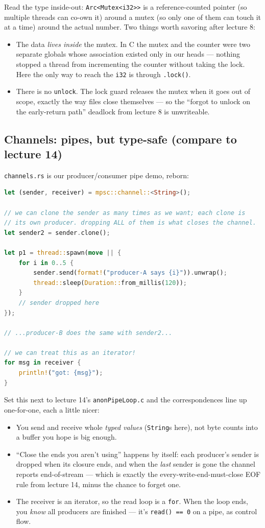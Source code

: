 \documentclass[11pt]{article}
\begin{document}
Read the type inside-out: \texttt{Arc<Mutex<i32>>} is a reference-counted
pointer (so multiple threads can co-own it) around a mutex (so only
one of them can touch it at a time) around the actual number. Two
things worth savoring after lecture 8:
\begin{itemize}
  \item The data \emph{lives inside} the mutex. In C the mutex and
    the counter were two separate globals whose association existed
    only in our heads --- nothing stopped a thread from incrementing
    the counter without taking the lock. Here the only way to reach
    the \texttt{i32} is through \texttt{.lock()}.
  \item There is no \texttt{unlock}. The lock guard releases the
    mutex when it goes out of scope, exactly the way files close
    themselves --- so the ``forgot to unlock on the early-return
    path'' deadlock from lecture 8 is unwriteable.
\end{itemize}

\subsection*{Channels: pipes, but type-safe (compare to lecture 14)}

\texttt{channels.rs} is our producer/consumer pipe demo, reborn:

\begin{lstlisting}[language=Rust]
let (sender, receiver) = mpsc::channel::<String>();

// we can clone the sender as many times as we want; each clone is
// its own producer. dropping ALL of them is what closes the channel.
let sender2 = sender.clone();

let p1 = thread::spawn(move || {
    for i in 0..5 {
        sender.send(format!("producer-A says {i}")).unwrap();
        thread::sleep(Duration::from_millis(120));
    }
    // sender dropped here
});

// ...producer-B does the same with sender2...

// we can treat this as an iterator!
for msg in receiver {
    println!("got: {msg}");
}
\end{lstlisting}

Set this next to lecture 14's \texttt{anonPipeLoop.c} and the
correspondences line up one-for-one, each a little nicer:
\begin{itemize}
  \item You send and receive whole \emph{typed values}
    (\texttt{String}s here), not byte counts into a buffer you hope
    is big enough.
  \item ``Close the ends you aren't using'' happens by itself: each
    producer's sender is dropped when its closure ends, and when the
    \emph{last} sender is gone the channel reports end-of-stream ---
    which is exactly the every-write-end-must-close EOF rule from
    lecture 14, minus the chance to forget one.
  \item The receiver is an iterator, so the read loop is a
    \texttt{for}. When the loop ends, you \emph{know} all producers
    are finished --- it's \texttt{read() == 0} on a pipe, as control
    flow.
\end{itemize}
\end{document}
